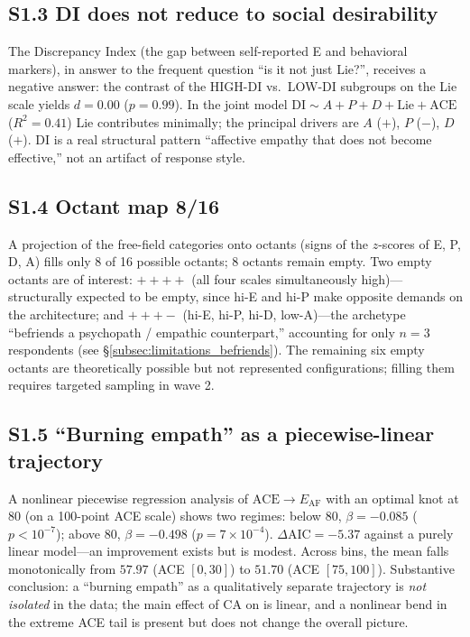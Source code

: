 \subsection*{S1.3 DI does not reduce to social desirability}
The Discrepancy Index (the gap between self-reported E and behavioral markers), in answer to the frequent question ``is it not just Lie?'', receives a negative answer: the contrast of the HIGH-DI vs.\ LOW-DI subgroups on the Lie scale yields $d = 0.00$ ($p = 0.99$). In the joint model $\mathrm{DI} \sim A + P + D + \mathrm{Lie} + \mathrm{ACE}$ ($R^2 = 0.41$) Lie contributes minimally; the principal drivers are $A$ ($+$), $P$ ($-$), $D$ ($+$). DI is a real structural pattern ``affective empathy that does not become effective,'' not an artifact of response style.

\subsection*{S1.4 Octant map 8/16}
A projection of the free-field categories onto octants (signs of the $z$-scores of E, P, D, A) fills only 8 of 16 possible octants; 8 octants remain empty. Two empty octants are of interest: $++++$ (all four scales simultaneously high)---structurally expected to be empty, since hi-E and hi-P make opposite demands on the architecture; and $+++-$ (hi-E, hi-P, hi-D, low-A)---the archetype ``befriends a psychopath / empathic counterpart,'' accounting for only $n = 3$ respondents (see §\ref{subsec:limitations_befriends}). The remaining six empty octants are theoretically possible but not represented configurations; filling them requires targeted sampling in wave 2.

\subsection*{S1.5 ``Burning empath'' as a piecewise-linear trajectory}
A nonlinear piecewise regression analysis of $\mathrm{ACE} \to E_{\mathrm{AF}}$ with an optimal knot at $80$ (on a 100-point ACE scale) shows two regimes: below 80, $\beta = -0.085$ ($p < 10^{-7}$); above 80, $\beta = -0.498$ ($p = 7 \times 10^{-4}$). $\Delta\mathrm{AIC} = -5.37$ against a purely linear model---an improvement exists but is modest. Across bins, the mean \EAF{} falls monotonically from $57.97$ (ACE $[0, 30]$) to $51.70$ (ACE $[75, 100]$). Substantive conclusion: a ``burning empath'' as a qualitatively separate trajectory is \emph{not isolated} in the data; the main effect of CA on \EAF{} is linear, and a nonlinear bend in the extreme ACE tail is present but does not change the overall picture.

